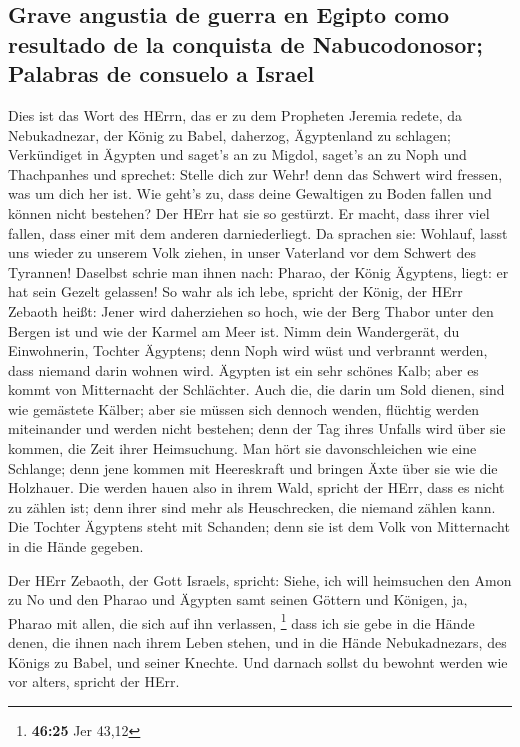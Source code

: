 \hypertarget{grave-angustia-de-guerra-en-egipto-como-resultado-de-la-conquista-de-nabucodonosor-palabras-de-consuelo-a-israel}{%
\subsection{Grave angustia de guerra en Egipto como resultado de la
conquista de Nabucodonosor; Palabras de consuelo a
Israel}\label{grave-angustia-de-guerra-en-egipto-como-resultado-de-la-conquista-de-nabucodonosor-palabras-de-consuelo-a-israel}}

 Dies ist das Wort des HErrn, das er zu dem Propheten
Jeremia redete, da Nebukadnezar, der König zu Babel, daherzog,
Ägyptenland zu schlagen;  Verkündiget in Ägypten und
saget's an zu Migdol, saget's an zu Noph und Thachpanhes und sprechet:
Stelle dich zur Wehr! denn das Schwert wird fressen, was um dich her
ist.  Wie geht's zu, dass deine Gewaltigen zu Boden
fallen und können nicht bestehen? Der HErr hat sie so gestürzt.
 Er macht, dass ihrer viel fallen, dass einer mit dem
anderen darniederliegt. Da sprachen sie: Wohlauf, lasst uns wieder zu
unserem Volk ziehen, in unser Vaterland vor dem Schwert des Tyrannen!
 Daselbst schrie man ihnen nach: Pharao, der König
Ägyptens, liegt: er hat sein Gezelt gelassen!  So wahr
als ich lebe, spricht der König, der HErr Zebaoth heißt: Jener wird
daherziehen so hoch, wie der Berg Thabor unter den Bergen ist und wie
der Karmel am Meer ist.  Nimm dein Wandergerät, du
Einwohnerin, Tochter Ägyptens; denn Noph wird wüst und verbrannt werden,
dass niemand darin wohnen wird.  Ägypten ist ein sehr
schönes Kalb; aber es kommt von Mitternacht der Schlächter.
 Auch die, die darin um Sold dienen, sind wie gemästete
Kälber; aber sie müssen sich dennoch wenden, flüchtig werden miteinander
und werden nicht bestehen; denn der Tag ihres Unfalls wird über sie
kommen, die Zeit ihrer Heimsuchung.  Man hört sie
davonschleichen wie eine Schlange; denn jene kommen mit Heereskraft und
bringen Äxte über sie wie die Holzhauer.  Die werden
hauen also in ihrem Wald, spricht der HErr, dass es nicht zu zählen ist;
denn ihrer sind mehr als Heuschrecken, die niemand zählen kann.
 Die Tochter Ägyptens steht mit Schanden; denn sie ist
dem Volk von Mitternacht in die Hände gegeben.

 Der HErr Zebaoth, der Gott Israels, spricht: Siehe, ich
will heimsuchen den Amon zu No und den Pharao und Ägypten samt seinen
Göttern und Königen, ja, Pharao mit allen, die sich auf ihn verlassen,
\footnote{\textbf{46:25} Jer 43,12}  dass ich sie gebe in
die Hände denen, die ihnen nach ihrem Leben stehen, und in die Hände
Nebukadnezars, des Königs zu Babel, und seiner Knechte. Und darnach
sollst du bewohnt werden wie vor alters, spricht der HErr.

